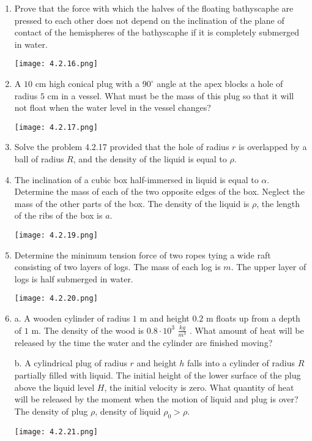 \documentclass{article}
\begin{document}
\begin{enumerate}[label=4.2.\arabic*]
\item Prove that the force with which the halves of the floating bathyscaphe are pressed to each other does not depend on the inclination of the plane of contact of the hemispheres of the bathyscaphe if it is completely submerged in water. 
\begin{center}
    \texttt{[image: 4.2.16.png]}
\end{center}

\item A $10$ cm high conical plug with a $90^{\circ}$ angle at the apex blocks a hole of radius $5$ cm in a vessel. What must be the mass of this plug so that it will not float when the water level in the vessel changes?
\begin{center}
    \texttt{[image: 4.2.17.png]}
\end{center}

\item Solve the problem 4.2.17 provided that the hole of radius $r$ is overlapped by a ball of radius $R$, and the density of the liquid is equal to $\rho$.   
\item The inclination of a cubic box half-immersed in liquid is equal to $\alpha$. Determine the mass of each of the two opposite edges of the box. Neglect the mass of the other parts of the box. The density of the liquid is $\rho$, the length of the ribs of the box is $a$. 
\begin{center}
    \texttt{[image: 4.2.19.png]}
\end{center}
\item Determine the minimum tension force of two ropes tying a wide raft consisting of two layers of logs. The mass of each log is $m$. The upper layer of logs is half submerged in water.
\begin{center}
    \texttt{[image: 4.2.20.png]}
\end{center}

\item a. A wooden cylinder of radius $1$ m and height $0.2$ m floats up from a depth of $1$ m. The density of the wood is $0.8 \cdot 10^3$ $\frac{kg}{m^3}$ . What amount of heat will be released by the time the water and the cylinder are finished moving? 

b.  A cylindrical plug of radius $r$ and height $h$ falls into a cylinder of radius $R$ partially filled with liquid. The initial height of the lower surface of the plug above the liquid level $H$, the initial velocity is zero. What quantity of heat will be released by the moment when the motion of liquid and plug is over? The density of plug $\rho$, density of liquid $\rho_0 > \rho$. 
\begin{center}
    \texttt{[image: 4.2.21.png]}
\end{center}


\end{enumerate}
\end{document}
